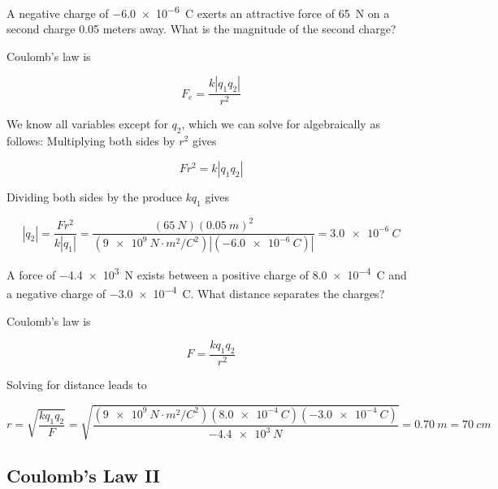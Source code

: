\documentclass[]{exam}
\begin{document}
\begin{questions}
\question
A negative charge of \SI{-6.0e-6}{C} exerts an attractive force of \SI{65}{N} on a second charge 0.05 meters away. What is the magnitude of the second charge?

\begin{solutionorbox}[3.3cm]
Coulomb's law is

\begin{equation*}
    F_e = \frac{k\left|q_1q_2\right|}{r^2}
\end{equation*}

We know all variables except for $q_2$, which we can solve for algebraically as follows: Multiplying both sides by $r^2$ gives

\begin{equation*}
    F r^2 = k |q_1 q_2|
\end{equation*}

Dividing both sides by the produce $k q_1$ gives

\begin{equation*}
    |q_2| = \frac{F r^2}{k |q_1|} = \frac{(\SI{65}{N})(\SI{0.05}{m})^2}{(\SI{9e9}{N\cdot m^2/C^2})|(-\SI{6.0e-6}{C})|} = \boxed{\SI{3.0e-6}{C}}
\end{equation*}
\end{solutionorbox}

\question 
A force of \SI{-4.4e3}{N} exists between a positive charge of \SI{8.0e-4}{C} and a negative charge of \SI{-3.0e-4}{C}. What distance separates the charges?

\begin{solutionorbox}[3.3cm]
Coulomb's law is

\begin{equation*}
    F = \frac{k q_1 q_2}{r^2}
\end{equation*}

Solving for distance leads to

\begin{equation*}
    r = \sqrt{\frac{kq_1q_2}{F}} = \sqrt{\frac{(\SI{9e9}{N\cdot m^2/C^2})(\SI{8.0e-4}{C})(\SI{-3.0e-4}{C})}{-\SI{4.4e3}{N}}} = \boxed{\SI{0.70}{m}} = \SI{70}{cm}
\end{equation*}
\end{solutionorbox}

\end{questions}

\clearpage


\subsection*{Coulomb's Law II}
\end{document}
